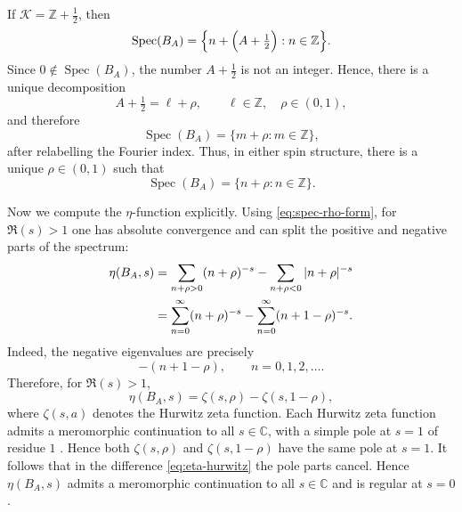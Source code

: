 \documentclass[11pt]{article}
\newcommand{\C}{\mathbb{C}}
\theoremstyle{definition}
\DeclareMathOperator{\Spec}{Spec}
\numberwithin{equation}{section}
\begin{document}
If $\mathcal K=\mathbb Z+\tfrac12$, then
\begin{equation}
\Spec(B_A)=\Bigl\{n+\Bigl(A+\tfrac12\Bigr):n\in\mathbb Z\Bigr\}.
\end{equation}
Since $0\notin\Spec(B_A)$, the number $A+\tfrac12$ is not an integer. Hence, there is a unique decomposition
\begin{equation}
A+\tfrac12=\ell+\rho,\qquad \ell\in\mathbb Z,\quad \rho\in(0,1),
\end{equation}
and therefore
\begin{equation}
\Spec(B_A)=\{m+\rho:m\in\mathbb Z\},
\end{equation}
after relabelling the Fourier index.
Thus, in either spin structure, there is a unique $\rho\in(0,1)$ such that
\begin{equation}
\label{eq:spec-rho-form}
\Spec(B_A)=\{n+\rho:n\in\mathbb Z\}.
\end{equation}










Now we compute the $\eta$-function explicitly.
Using \eqref{eq:spec-rho-form}, for $\Re(s)>1$ one has absolute convergence and can split the positive and negative parts of the spectrum:
\begin{align}
\eta(B_A,s)
&=
\sum_{n+\rho>0}(n+\rho)^{-s}
-
\sum_{n+\rho<0}|n+\rho|^{-s} \notag\\
&=
\sum_{n=0}^{\infty}(n+\rho)^{-s}
-
\sum_{n=0}^{\infty}(n+1-\rho)^{-s}.
\label{eq:eta-rho-split}
\end{align}
Indeed, the negative eigenvalues are precisely
\begin{equation}
-(n+1-\rho),\qquad n=0,1,2,\dots.
\end{equation}
Therefore, for $\Re(s)>1$,
\begin{equation}
\label{eq:eta-hurwitz}
\eta(B_A,s)=\zeta(s,\rho)-\zeta(s,1-\rho),
\end{equation}
where $\zeta(s,a)$ denotes the Hurwitz zeta function. Each Hurwitz zeta function admits a meromorphic continuation to all $s\in\C$, with a simple pole at $s=1$ of residue $1$ \cite{Apostol}. Hence both $\zeta(s,\rho)$ and $\zeta(s,1-\rho)$ have the same pole at $s=1$. It follows that in the difference \eqref{eq:eta-hurwitz} the pole parts cancel. Hence \(\eta(B_A,s)\) admits a meromorphic continuation to all \(s\in\C\) and is regular at \(s=0\).
\end{document}

